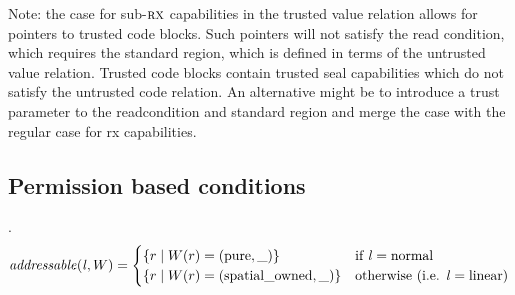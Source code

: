 \documentclass[a4paper]{article}
\begin{document}
Note: the case for sub-$\textsc{rx}$ capabilities in the trusted value relation allows for pointers to trusted code blocks.
Such pointers will not satisfy the read condition, which requires the standard region, which is defined in terms of the untrusted value relation.
Trusted code blocks contain trusted seal capabilities which do not satisfy the untrusted code relation.
An alternative might be to introduce a trust parameter to the readcondition and standard region and merge the case with the regular case for rx capabilities.

\subsection{Permission based conditions}
.
\[
  \addressable{\lin,W} =
  \begin{cases}
    \{ r \mid W(r) = (\pure,\_) \} & \text{if $\lin = \normal$} \\
    \{ r \mid W(r) = (\spatialo,\_) \}  & \text{otherwise (i.e. $\lin = \linear$)} \\
  \end{cases}
\]
\end{document}
